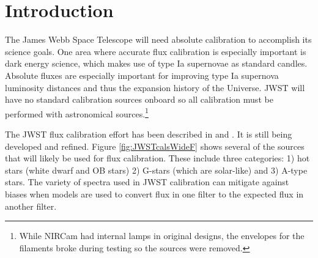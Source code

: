\documentclass{aastex6}
\begin{document}




\section{Introduction}

The James Webb Space Telescope \citep[JWST; e.g.][]{gardner2006SSRv} will need absolute calibration to accomplish its science goals.
One area where accurate flux calibration is especially important is dark energy science, which makes use of type Ia supernovae as standard candles.
Absolute fluxes are especially important for improving type Ia supernova luminosity distances and thus the expansion history of the Universe.
JWST will have no standard calibration sources onboard so all calibration must be performed with astronomical sources.\footnote{While NIRCam had internal lamps in original designs, the envelopes for the filaments broke during testing so the sources were removed.}

The JWST flux calibration effort has been described in \citet{gordon2009fluxplan1} and \citet{gordon2011fluxplan2}.
It is still being developed and refined.
Figure \ref{fig:JWSTcalsWideF} shows several of the sources that will likely be used for flux calibration.
These include three categories: 1) hot stars (white dwarf and OB stars) 2) G-stars (which are solar-like) and 3) A-type stars.
The variety of spectra used in JWST calibration can mitigate against biases when models are used to convert flux in one filter to the expected flux in another filter.
\end{document}
